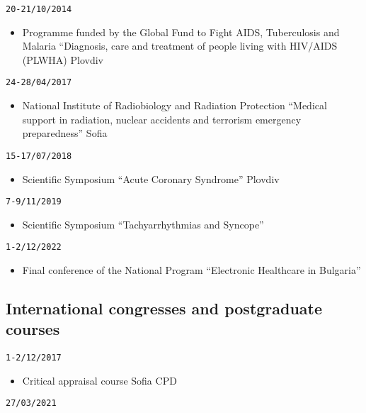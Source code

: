 \documentclass[
  12pt,
  letterpaper,
  DIV=11,
  numbers=noendperiod]{scrartcl}
\providecommand{\tightlist}{%
  \setlength{\itemsep}{0pt}\setlength{\parskip}{0pt}}\usepackage{longtable,booktabs,array}
\begin{document}
\texttt{20-21/10/2014}

\begin{itemize}
\tightlist
\item
  Programme funded by the Global Fund to Fight AIDS, Tuberculosis and
  Malaria \textbar{} ``Diagnosis, care and treatment of people living
  with HIV/AIDS (PLWHA) \textbar{} Plovdiv
\end{itemize}

\texttt{24-28/04/2017}

\begin{itemize}
\tightlist
\item
  National Institute of Radiobiology and Radiation Protection \textbar{}
  ``Medical support in radiation, nuclear accidents and terrorism
  emergency preparedness'' \textbar{} Sofia
\end{itemize}

\texttt{15-17/07/2018}

\begin{itemize}
\tightlist
\item
  Scientific Symposium \textbar{} ``Acute Coronary Syndrome'' \textbar{}
  Plovdiv
\end{itemize}

\texttt{7-9/11/2019}

\begin{itemize}
\tightlist
\item
  Scientific Symposium \textbar{} ``Tachyarrhythmias and Syncope''
\end{itemize}

\texttt{1-2/12/2022}

\begin{itemize}
\tightlist
\item
  Final conference of the National Program ``Electronic Healthcare in
  Bulgaria''
\end{itemize}

\subsection{International congresses and postgraduate
courses}\label{international-congresses-and-postgraduate-courses}

\texttt{1-2/12/2017}

\begin{itemize}
\tightlist
\item
  Critical appraisal course \textbar{} Sofia CPD
\end{itemize}

\texttt{27/03/2021}
\end{document}
